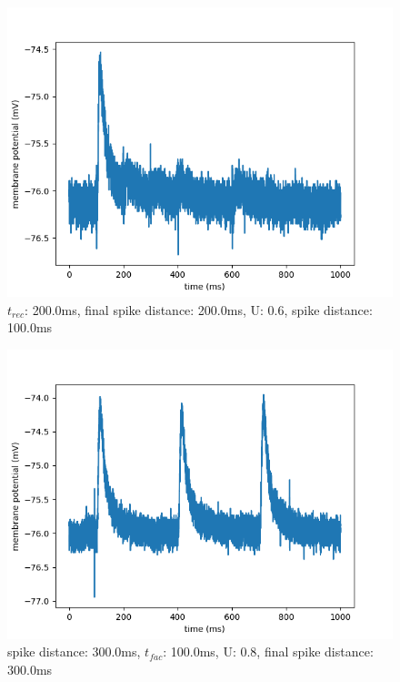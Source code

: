 \documentclass[10pt,a4paper]{scrartcl}
\begin{document}
\newpage

\begin{figure} [ht]
\begin{center}
\label{fig:abb21}
\caption{$t_{rec}$: 200.0ms, final spike distance: 200.0ms, U: 0.6, spike distance: 100.0ms}
\includegraphics[scale=0.35]{pictures/final_spike_variation_11.pdf} 
\end{center}
\end{figure}

\begin{figure} [ht]
\begin{center}
\label{fig:abb22}
\caption{spike distance: 300.0ms, $t_{fac}$: 100.0ms, U: 0.8, final spike distance: 300.0ms}
\includegraphics[scale=0.35]{pictures/final_spike_variation_12.pdf} 
\end{center}
\end{figure}
\end{document}
